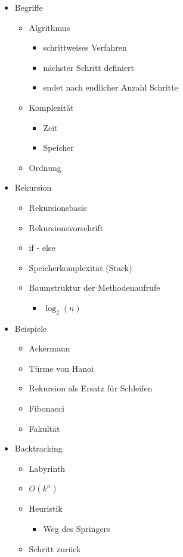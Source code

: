 \begin{itemize}
    \item Begriffe
    \begin{itemize}
        \item Algrithmus
        \begin{itemize}
            \item schrittweises Verfahren
            \item nächster Schritt definiert
            \item endet nach endlicher Anzahl Schritte
        \end{itemize}
        \item Komplezität
        \begin{itemize}
            \item Zeit
            \item Speicher
        \end{itemize}
        \item Ordnung
    \end{itemize}
    
    \item Rekursion
    \begin{itemize}
        \item Rekursionsbasis
        \item Rekursionsvorschrift
        \item if - else
        \item Speicherkomplexität (Stack)
        \item Baumstruktur der Methodenaufrufe
        \begin{itemize}
            \item $\log_2(n)$
        \end{itemize}
    \end{itemize}
    
    \item Beispiele
    \begin{itemize}
        \item Ackermann
        \item Türme von Hanoi
        \item Rekursion als Ersatz für Schleifen
        \item Fibonacci
        \item Fakultät
    \end{itemize}
    
    \item Backtracking
    \begin{itemize}
        \item Labyrinth
        \item $O(k^n)$
        \item Heuristik
        \begin{itemize}
            \item Weg des Springers
        \end{itemize}
        \item Schritt zurück
    \end{itemize}
    

\end{itemize}
